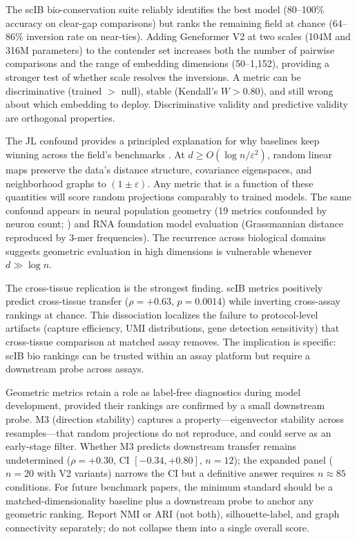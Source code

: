 \documentclass[11pt]{article}
\begin{document}
The scIB bio-conservation suite reliably identifies the best model (80--100\% accuracy on clear-gap comparisons) but ranks the remaining field at chance (64--86\% inversion rate on near-ties). Adding Geneformer V2 at two scales (104M and 316M parameters) to the contender set increases both the number of pairwise comparisons and the range of embedding dimensions (50--1{,}152), providing a stronger test of whether scale resolves the inversions. A metric can be discriminative (trained $>$ null), stable (Kendall's $W > 0.80$), and still wrong about which embedding to deploy. Discriminative validity and predictive validity are orthogonal properties.

The JL confound provides a principled explanation for why baselines keep winning across the field's benchmarks \citep{johnsonlindenstrauss1984}. At $d \geq O(\log n / \varepsilon^2)$, random linear maps preserve the data's distance structure, covariance eigenspaces, and neighborhood graphs to $(1 \pm \varepsilon)$. Any metric that is a function of these quantities will score random projections comparably to trained models. The same confound appears in neural population geometry (19 metrics confounded by neuron count; \citealp{tower2026bracket}) and RNA foundation model evaluation (Grassmannian distance reproduced by 3-mer frequencies). The recurrence across biological domains suggests geometric evaluation in high dimensions is vulnerable whenever $d \gg \log n$.

The cross-tissue replication is the strongest finding. scIB metrics positively predict cross-tissue transfer ($\rho = +0.63$, $p = 0.0014$) while inverting cross-assay rankings at chance. This dissociation localizes the failure to protocol-level artifacts (capture efficiency, UMI distributions, gene detection sensitivity) that cross-tissue comparison at matched assay removes. The implication is specific: scIB bio rankings can be trusted within an assay platform but require a downstream probe across assays.

Geometric metrics retain a role as label-free diagnostics during model development, provided their rankings are confirmed by a small downstream probe. M3 (direction stability) captures a property---eigenvector stability across resamples---that random projections do not reproduce, and could serve as an early-stage filter. Whether M3 predicts downstream transfer remains undetermined ($\rho = +0.30$, CI $[-0.34, +0.80]$, $n = 12$); the expanded panel ($n = 20$ with V2 variants) narrows the CI but a definitive answer requires $n \approx 85$ conditions. For future benchmark papers, the minimum standard should be a matched-dimensionality baseline plus a downstream probe to anchor any geometric ranking. Report NMI or ARI (not both), silhouette-label, and graph connectivity separately; do not collapse them into a single overall score.
\end{document}

